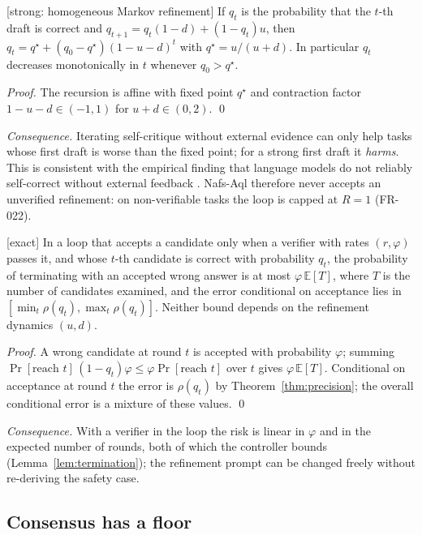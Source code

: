 \begin{theorem}
\textnormal{[strong: homogeneous Markov refinement]}
\label{thm:selfrefine}
If $q_t$ is the probability that the $t$-th draft is correct and
$q_{t+1}=q_t(1-d)+(1-q_t)u$, then
$q_t=q^\star+(q_0-q^\star)(1-u-d)^t$ with $q^\star=u/(u+d)$. In particular
$q_t$ decreases monotonically in $t$ whenever $q_0>q^\star$.
\end{theorem}
\begin{proof}
The recursion is affine with fixed point $q^\star$ and contraction factor
$1-u-d\in(-1,1)$ for $u+d\in(0,2)$. \qed
\end{proof}
\emph{Consequence.} Iterating self-critique without external evidence can only
help tasks whose first draft is worse than the fixed point; for a strong first
draft it \emph{harms}. This is consistent with the empirical finding that
language models do not reliably self-correct without external feedback
\cite{huang2024selfcorrect,kamoi2024survey}. Nafs-Aql therefore never accepts an
unverified refinement: on non-verifiable tasks the loop is capped at $R=1$
(FR-022).

\begin{theorem} \textnormal{[exact]}
\label{thm:gatedloop}
In a loop that accepts a candidate only when a verifier with rates
$(r,\varphi)$ passes it, and whose $t$-th candidate is correct with
probability $q_t$, the probability of terminating with an accepted wrong answer
is at most $\varphi\,\mathbb E[T]$, where $T$ is the number of candidates
examined, and the error conditional on acceptance lies in
$[\min_t\rho(q_t),\max_t\rho(q_t)]$. Neither bound depends on the refinement
dynamics $(u,d)$.
\end{theorem}
\begin{proof}
A wrong candidate at round $t$ is accepted with probability $\varphi$;
summing $\Pr[\text{reach }t]\,(1-q_t)\varphi\le\varphi\Pr[\text{reach }t]$
over $t$ gives $\varphi\,\mathbb E[T]$. Conditional on acceptance at round $t$
the error is $\rho(q_t)$ by Theorem~\ref{thm:precision}; the overall
conditional error is a mixture of these values. \qed
\end{proof}
\emph{Consequence.} With a verifier in the loop the risk is linear in
$\varphi$ and in the expected number of rounds, both of which the controller
bounds (Lemma~\ref{lem:termination}); the refinement prompt can be changed
freely without re-deriving the safety case.

\subsection{Consensus has a floor}

